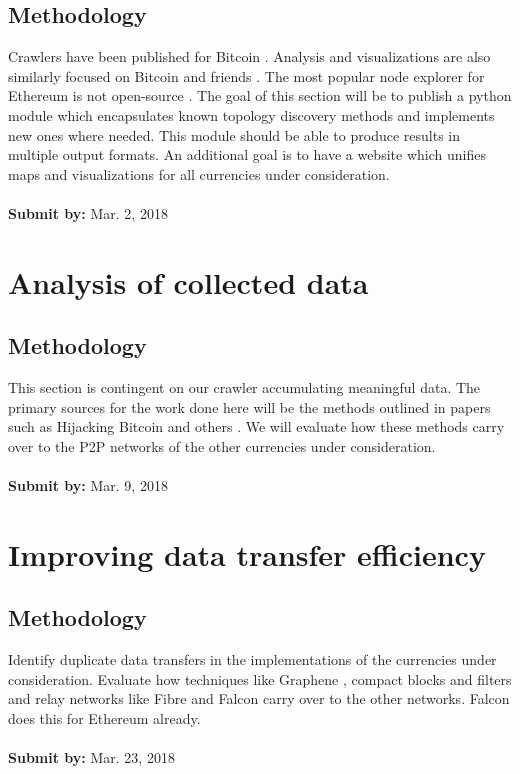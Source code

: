 \documentclass{article}
\begin{document}
\subsection* {Methodology}
Crawlers have been published for Bitcoin \cite{bitnodes, btc-crawler}. Analysis and visualizations are also similarly focused on Bitcoin and friends \cite{dance, bitinfo}. The most popular node explorer for Ethereum is not open-source \cite{ethernodes}. The goal of this section will be to publish a python module which encapsulates known topology discovery methods and implements new ones where needed. This module should be able to produce results in multiple output formats. An additional goal is to have a website which unifies maps and visualizations for all currencies under consideration.\\
\\
\textbf{Submit by: } Mar. 2, 2018

\section{Analysis of collected data}
\subsection* {Methodology}
This section is contingent on our crawler accumulating meaningful data. The primary sources for the work done here will be the methods outlined in papers such as Hijacking Bitcoin and others \cite{hijack, topology, aslevel}. We will evaluate how these methods carry over to the P2P networks of the other currencies under consideration.
\\
\\
\textbf{Submit by: } Mar. 9, 2018

\section{Improving data transfer efficiency}
\subsection* {Methodology}
Identify duplicate data transfers in the implementations of the currencies under consideration. Evaluate how techniques like Graphene \cite{graphene} , compact blocks \cite{compact} and filters \cite{filters} and relay networks like Fibre \cite{fibre} and Falcon \cite{falcon} carry over to the other networks. Falcon does this for Ethereum already.
\\
\\
\textbf{Submit by: } Mar. 23, 2018
\end{document}
